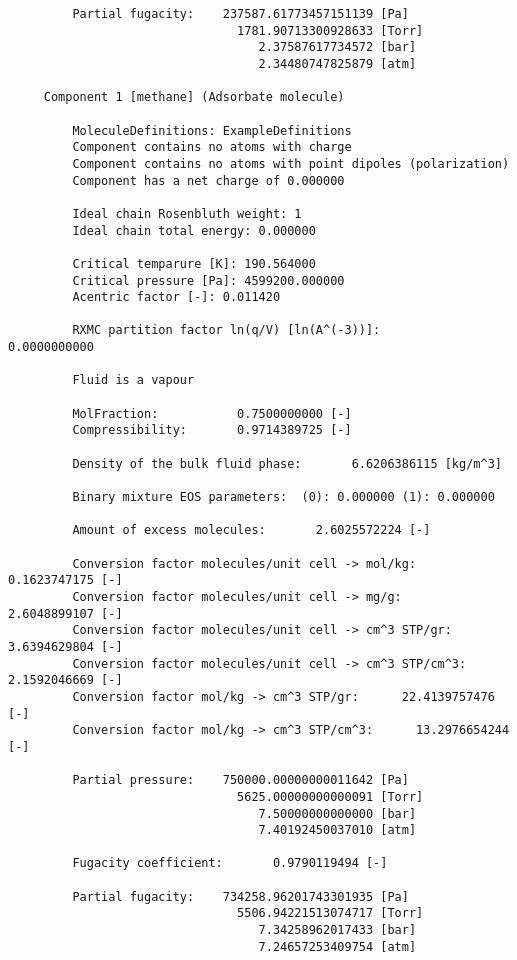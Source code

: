 \begin{tiny}
\begin{verbatim}
         Partial fugacity:    237587.61773457151139 [Pa]
                                1781.90713300928633 [Torr]
                                   2.37587617734572 [bar]
                                   2.34480747825879 [atm]

     Component 1 [methane] (Adsorbate molecule)

         MoleculeDefinitions: ExampleDefinitions
         Component contains no atoms with charge
         Component contains no atoms with point dipoles (polarization)
         Component has a net charge of 0.000000

         Ideal chain Rosenbluth weight: 1
         Ideal chain total energy: 0.000000

         Critical temparure [K]: 190.564000
         Critical pressure [Pa]: 4599200.000000
         Acentric factor [-]: 0.011420

         RXMC partition factor ln(q/V) [ln(A^(-3))]:       0.0000000000

         Fluid is a vapour

         MolFraction:           0.7500000000 [-]
         Compressibility:       0.9714389725 [-]

         Density of the bulk fluid phase:       6.6206386115 [kg/m^3]

         Binary mixture EOS parameters:  (0): 0.000000 (1): 0.000000

         Amount of excess molecules:       2.6025572224 [-]

         Conversion factor molecules/unit cell -> mol/kg:       0.1623747175 [-]
         Conversion factor molecules/unit cell -> mg/g:       2.6048899107 [-]
         Conversion factor molecules/unit cell -> cm^3 STP/gr:       3.6394629804 [-]
         Conversion factor molecules/unit cell -> cm^3 STP/cm^3:       2.1592046669 [-]
         Conversion factor mol/kg -> cm^3 STP/gr:      22.4139757476 [-]
         Conversion factor mol/kg -> cm^3 STP/cm^3:      13.2976654244 [-]

         Partial pressure:    750000.00000000011642 [Pa]
                                5625.00000000000091 [Torr]
                                   7.50000000000000 [bar]
                                   7.40192450037010 [atm]

         Fugacity coefficient:       0.9790119494 [-]

         Partial fugacity:    734258.96201743301935 [Pa]
                                5506.94221513074717 [Torr]
                                   7.34258962017433 [bar]
                                   7.24657253409754 [atm]
\end{verbatim}
\end{tiny}
